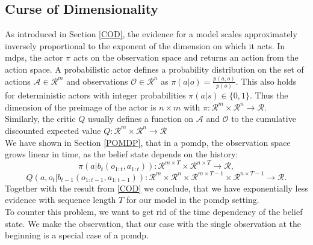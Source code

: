 \subsection{Curse of Dimensionality}
\label{COD_AC}
As introduced in Section \ref{COD}, the evidence for a model scales approximately inversely proportional to the exponent of the dimension on which it acts. In \ac{mdp}s, the 
actor $\pi$ acts on the observation space and returns an action from the action space. A probabilistic actor defines a probability distribution on the set 
of actions $\mathcal{A} \in \mathcal{R}^m$ and observations $\mathcal{O} \in \mathcal{R}^n$ as $\pi(a|o) = \frac{p(a,o)}{p(o)}$. This also holds for 
deterministic actors with integer probabilities $\pi(a|s) \in \{0,1\}$.
Thus the dimension of the preimage of the actor is $n \times m$ with $\pi:\mathcal{R}^m \times \mathcal{R}^n \rightarrow \mathcal{R}$.\\

Similarly, the critic $Q$ usually defines a function on $\mathcal{A}$ and $\mathcal{O}$ to the cumulative discounted expected value 
$Q:\mathcal{R}^m \times \mathcal{R}^n \rightarrow \mathcal{R}$\\
We have shown in Section \ref{POMDP}, that in a \ac{pomdp}, the observation space grows linear in time, as the belief state depends on the history: 
$$\pi(a| b_t(o_{1:t}, a_{1:t})):\mathcal{R}^{m \times T} \times \mathcal{R}^{n \times T} \rightarrow \mathcal{R},$$
$$Q(a, o_{t}| b_{t-1}(o_{1:t-1}, a_{1:t-1})):\mathcal{R}^{m} \times \mathcal{R}^{n} \times \mathcal{R}^{m \times T-1} \times \mathcal{R}^{n \times T-1} \rightarrow \mathcal{R}.$$
Together with the result from \ref{COD} we conclude, that we have 
exponentially less evidence with sequence length $T$ for our model in the \ac{pomdp} setting.\\

To counter this problem, we want to get rid of the time dependency of the belief state. 
We make the observation, that our case with the single observation at the beginning is a special case of a \ac{pomdp}.\\

